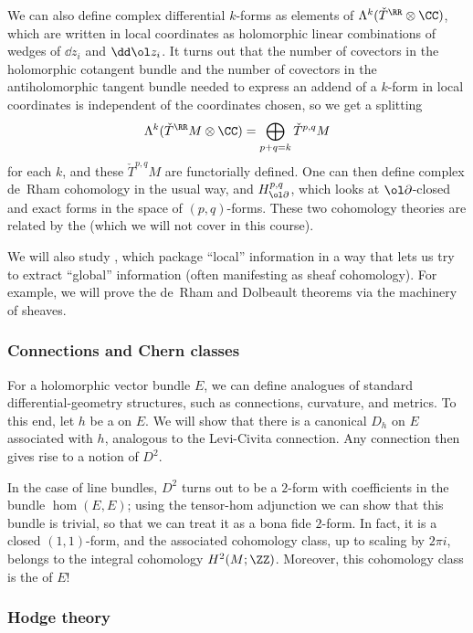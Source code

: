 \documentclass[10pt]{article}
\begin{document}
We can also define complex differential $k$-forms as
elements of $\Lambda^k (\check T^\RR\otimes\CC)$,
which are written in local coordinates as
holomorphic linear combinations of wedges of $\dd z_i$ and $\dd\ol z_i$.
It turns out that the number of covectors in the holomorphic cotangent bundle
and the number of covectors in the antiholomorphic tangent bundle
needed to express an addend of a $k$-form in local coordinates
is independent of the coordinates chosen, so we get a splitting
\begin{equation*}
    \Lambda^k(\check T^\RR M\otimes\CC) = \bigoplus_{p+q=k}\check T^{p,q}M
\end{equation*}
for each $k$, and these $\check T^{p,q}M$ are functorially defined.
One can then define complex de~Rham cohomology in the usual way,
and  $H^{p,q}_{\ol\partial}$,
which looks at $\ol\partial$-closed and exact forms
in the space of $(p,q)$-forms.
These two cohomology theories are related by the
(which we will not cover in this course).

We will also study ,
which package ``local'' information in a way that
lets us try to extract ``global'' information (often manifesting as
sheaf cohomology). For example, we will prove
the de~Rham and Dolbeault theorems via the machinery of sheaves.

\subsubsection{Connections and Chern classes}
For a holomorphic vector bundle $E$, we can define
analogues of standard differential-geometry structures, such as
connections, curvature, and metrics.
To this end, let $h$ be a  on $E$.
We will show that there is a canonical  $D_h$
on $E$ associated with $h$, analogous to the Levi-Civita connection.
Any connection then gives rise to a notion of  $D^2$.

In the case of line bundles, $D^2$ turns out to be a
$2$-form with coefficients in the bundle $\hom(E,E)$;
using the tensor-hom adjunction we can show that this bundle is trivial,
so that we can treat it as a bona fide $2$-form.
In fact, it is a closed $(1,1)$-form, and the associated cohomology class,
up to scaling by $2\pi i$, belongs to the integral cohomology $H^2(M;\ZZ)$.
Moreover, this cohomology class is the  of $E$!

\subsubsection{Hodge theory}
\end{document}
